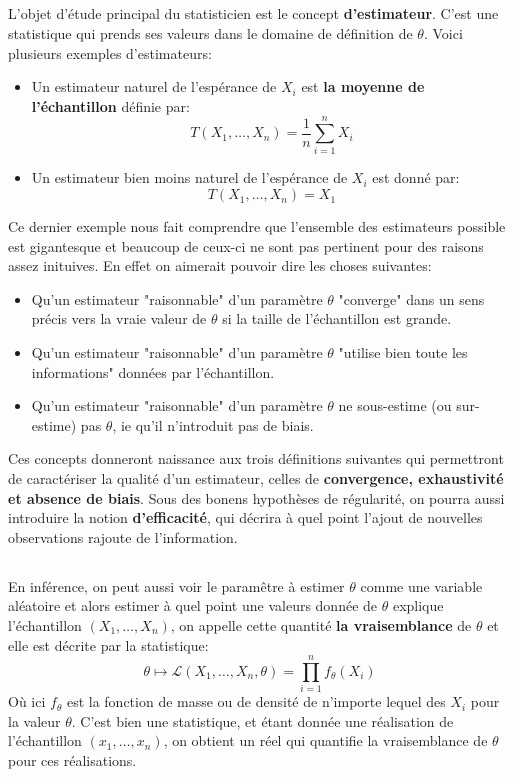 \subsection*{}
L'objet d'étude principal du statisticien est le concept \textbf{d'estimateur}. C'est une statistique qui prends ses valeurs dans le domaine de définition de \( \theta \). Voici plusieurs exemples d'estimateurs:
\begin{itemize}
   \item Un estimateur naturel de l'espérance de \( X_i \) est \textbf{la moyenne de l'échantillon} définie par:
   \[ 
       T(X_1, \ldots, X_n) = \frac{1}{n}\sum_{i = 1}^n X_i
   \]
   \item Un estimateur bien moins naturel de l'espérance de \( X_i \) est donné par:
   \[ 
       T(X_1, \ldots, X_n) = X_1
   \]
\end{itemize}
Ce dernier exemple nous fait comprendre que l'ensemble des estimateurs possible est gigantesque et beaucoup de ceux-ci ne sont pas pertinent pour des raisons assez inituives. En effet on aimerait pouvoir dire les choses suivantes:
\begin{itemize}
   \item Qu'un estimateur "raisonnable" d'un paramètre \( \theta \) "converge" dans un sens précis vers la vraie valeur de \( \theta \) si la taille de l'échantillon est grande.
   \item Qu'un estimateur "raisonnable" d'un paramètre \( \theta \) "utilise bien toute les informations" données par l'échantillon.
   \item Qu'un estimateur "raisonnable" d'un paramètre \( \theta \) ne sous-estime (ou sur-estime) pas \( \theta \), ie qu'il n'introduit pas de biais.
\end{itemize}
Ces concepts donneront naissance aux trois définitions suivantes qui permettront de caractériser la qualité d'un estimateur, celles de \textbf{convergence, exhaustivité et absence de biais}. Sous des bonens hypothèses de régularité, on pourra aussi introduire la notion \textbf{d'efficacité}, qui décrira à quel point l'ajout de nouvelles observations rajoute de l'information.
\subsection*{}
En inférence, on peut aussi voir le paramêtre à estimer \( \theta \) comme une variable aléatoire et alors estimer à quel point une valeurs donnée de \( \theta \) explique l'échantillon \( (X_1, \ldots, X_n) \), on appelle cette quantité \textbf{la vraisemblance} de \( \theta \) et elle est décrite par la statistique:
\[ 
   \theta \mapsto \mathcal{L}(X_1, \ldots, X_n, \theta) = \prod_{i = 1}^n f_{\theta}(X_i)
\]
Où ici \( f_{\theta} \) est la fonction de masse ou de densité de n'importe lequel des \( X_i \) pour la valeur \( \theta \). C'est bien une statistique, et étant donnée une réalisation de l'échantillon \( (x_1, \ldots, x_n) \), on obtient un réel qui quantifie la vraisemblance de \( \theta \) pour ces réalisations.\<

